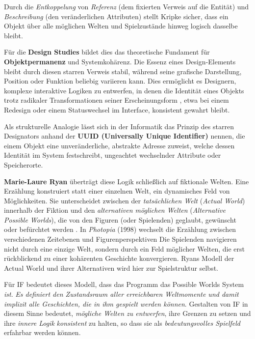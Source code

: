 \documentclass[parskip=half,a4paper,11pt]{scrreprt}
\begin{document}
Durch die \textit{Entkoppelung} von \textit{Referenz} (dem fixierten Verweis auf die Entität) und \textit{Beschreibung} (den veränderlichen Attributen) stellt Kripke sicher, dass ein Objekt über alle möglichen Welten und Spielzustände hinweg logisch dasselbe bleibt.

Für die \textbf{Design Studies} bildet dies das theoretische Fundament für \textbf{Objektpermanenz} und Systemkohärenz. Die Essenz eines Design-Elements bleibt durch diesen starren Verweis stabil, während seine grafische Darstellung, Position oder Funktion beliebig variieren kann. Dies ermöglicht es Designern, komplexe interaktive Logiken zu entwerfen, in denen die Identität eines Objekts trotz radikaler Transformationen seiner Erscheinungsform , etwa bei einem Redesign oder einem Statuswechsel im Interface, konsistent gewahrt bleibt.

Als strukturelle Analogie lässt sich in der Informatik das Prinzip des starren Designators anhand der \textbf{UUID (Universally Unique Identifier)} nennen, die einem Objekt eine unveränderliche, abstrakte Adresse zuweist, welche dessen Identität im System festschreibt, ungeachtet wechselnder Attribute oder Speicherorte.

\textbf{Marie-Laure Ryan} überträgt diese Logik schließlich auf fiktionale Welten. Eine Erzählung konstruiert statt einer einzelnen Welt, ein dynamisches Feld von Möglichkeiten. Sie unterscheidet zwischen der \textit{tatsächlichen Welt} (\textit{Actual World}) innerhalb der Fiktion und den \textit{alternativen möglichen Welten} (\textit{Alternative Possible Worlds}), die von den Figuren (oder Spielenden) geglaubt, gewünscht oder befürchtet werden \citep{Ryan1991}. In \textit{Photopia} (1998) wechselt die Erzählung zwischen verschiedenen Zeitebenen und Figurenperspektiven Die Spielenden navigieren nicht durch eine einzige Welt, sondern durch ein Feld möglicher Welten, die erst rückblickend zu einer kohärenten Geschichte konvergieren. Ryans Modell der Actual World und ihrer Alternativen wird hier zur Spielstruktur selbst.

Für IF bedeutet dieses Modell, dass das Programm das Possible Worlds System \textit{ist}.\textit{ Es definiert den Zustandsraum aller erreichbaren Weltmomente und damit implizit alle Geschichten, die in ihm gespielt werden können}. Gestalten von IF  in diesem Sinne bedeutet, \textit{mögliche Welten zu entwerfen}, ihre Grenzen zu setzen und ihre \textit{innere Logik} \textit{konsistent} zu halten, so dass sie als \textit{bedeutungsvolles Spielfeld} erfahrbar werden können.
\end{document}
